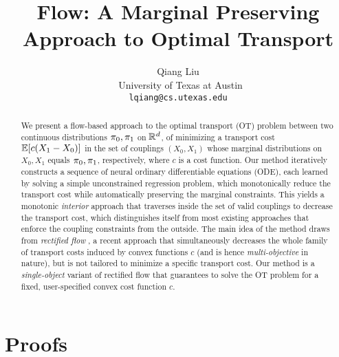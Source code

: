 \documentclass[11pt]{article}
\title{\huge {\Name} Flow: 
A Marginal Preserving Approach to Optimal Transport 
}
\author{
Qiang Liu \\ 
    ~University of Texas at Austin\\
	\texttt{lqiang@cs.utexas.edu}
}
\date{}
\begin{document}
\maketitle

\begin{abstract}
We present a flow-based approach to 
the optimal transport (OT) problem 
between two continuous distributions ${\pi}_0,{\pi}_1$ on $\mathbb{R}^d$,
of minimizing a transport cost $\mathbb{E}[c(X_1-X_0)]$ 
in the set of couplings $(X_0,X_1)$ whose marginal distributions on $X_0,X_1$ equals ${\pi}_0,{\pi}_1$, respectively, 
where $c$ is a cost function.
Our method iteratively constructs a sequence of neural ordinary differentiable equations (ODE),  
each learned by solving a simple unconstrained regression problem, which 
monotonically reduce the transport cost while automatically preserving the marginal constraints. 
This yields a monotonic 
\emph{interior} approach that traverses inside the set of valid couplings to decrease the transport cost, 
which distinguishes itself from most existing approaches that enforce the coupling constraints from the outside. 
The main idea of the method draws from 
\emph{rectified flow} \cite{rectified}, 
a recent approach 
that simultaneously decreases 
the whole family of  
transport costs induced by convex functions $c$
(and is hence \emph{multi-objective} in nature), 
but is not tailored to minimize a  specific transport cost. 
Our method is a \emph{single-object} variant of rectified flow 
that guarantees to solve the OT problem 
for a fixed, user-specified convex cost function $c$. 
\end{abstract}




 
 

\appendix 
\section{Proofs} 
\printProofs
\end{document}
